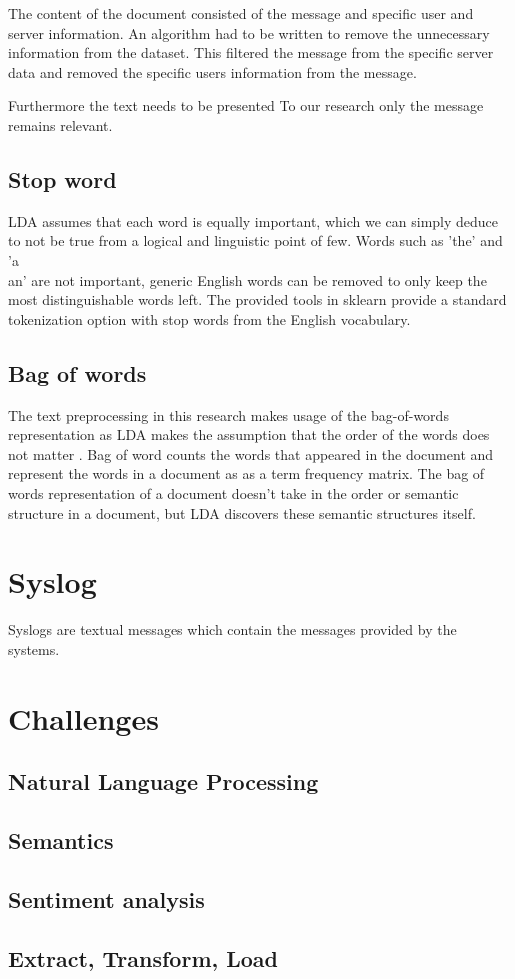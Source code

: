 The content of the document consisted of the message and specific user and server information. An algorithm had to be written to remove the unnecessary information from the dataset. This filtered the message from the specific server data and removed the specific users information from the message. 

Furthermore the text needs to be presented
To our research only the message remains relevant.

\subsection{Stop word}\label{stop_words}
LDA assumes that each word is equally important, which we can simply deduce to not be true from a logical and linguistic point of few. Words such as 'the' and 'a\\an' are not important, generic English words can be removed to only keep the most distinguishable words left. The provided tools in sklearn provide a standard tokenization option with stop words from the English vocabulary.

\subsection{Bag of words} \label{bagow}
The text preprocessing in this research makes usage of the bag-of-words representation as LDA makes the assumption that the order of the words does not matter \cite{Blei2010}. Bag of word counts the words that appeared in the document and represent the words in a document as as a term frequency matrix. The bag of words representation of a document doesn't take in the order or semantic structure in a document, but LDA discovers these semantic structures itself. 

\section{Syslog} 
Syslogs are textual messages \cite{Stearley2004TowardsSyslogs} which contain the messages provided by the systems.


\section{Challenges}

\subsection{Natural Language Processing}


\subsection{Semantics}


\subsection{Sentiment analysis}


\subsection{Extract, Transform, Load}

